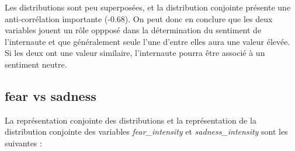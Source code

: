 \documentclass{article}
\begin{document}
Les distributions sont peu superposées, et la distribution conjointe présente une
anti-corrélation importante (-0.68). On peut donc en conclure que les deux variables jouent
un rôle oppposé dans la détermination du sentiment de l'internaute et que
généralement seule l'une d'entre elles aura une valeur élevée. Si les deux ont une
valeur similaire, l'internaute pourra être associé à un sentiment neutre.

\subsection*{fear vs sadness}

La représentation conjointe des distributions et la représentation de la
distribution conjointe des variables
\textit{fear\_intensity} et \textit{sadness\_intensity}
sont les suivantes :
\end{document}
